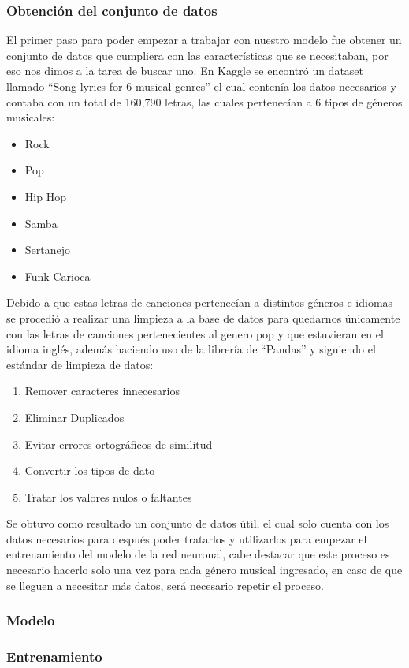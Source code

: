 \subsubsection{Obtención del conjunto de datos}
El primer paso para poder empezar a trabajar con nuestro modelo fue obtener un conjunto de datos que cumpliera con las características que se necesitaban, por eso nos dimos a la tarea de buscar uno. En Kaggle \cite{kaggle1} se encontró un dataset llamado “Song lyrics for 6 musical genres” \cite{kaggleDataset} el cual contenía los datos necesarios y contaba con un total de 160,790 letras, las cuales pertenecían a 6 tipos de géneros musicales:
\begin{itemize}
	\item Rock
	\item Pop
	\item Hip Hop
	\item Samba
	\item Sertanejo
	\item Funk Carioca
\end{itemize}
Debido a que estas letras de canciones pertenecían a distintos géneros e idiomas se procedió a realizar una limpieza a la base de datos para quedarnos únicamente con las letras de canciones pertenecientes al genero pop y que estuvieran en el idioma inglés, además haciendo uso de la librería de “Pandas” y siguiendo el estándar de limpieza de datos: \cite{data_cleaning}
\begin{enumerate}
	\item Remover caracteres innecesarios
	\item Eliminar Duplicados
	\item Evitar errores ortográficos de similitud
	\item Convertir los tipos de dato
	\item Tratar los valores nulos o faltantes
\end{enumerate}
Se obtuvo como resultado un conjunto de datos útil, el cual solo cuenta con los datos necesarios para después poder tratarlos y utilizarlos para empezar el entrenamiento del modelo de la red neuronal, cabe destacar que este proceso es necesario hacerlo solo una vez para cada género musical ingresado, en caso de que se lleguen a necesitar más datos, será necesario repetir el proceso.
\subsubsection{Modelo}

\subsubsection{Entrenamiento}